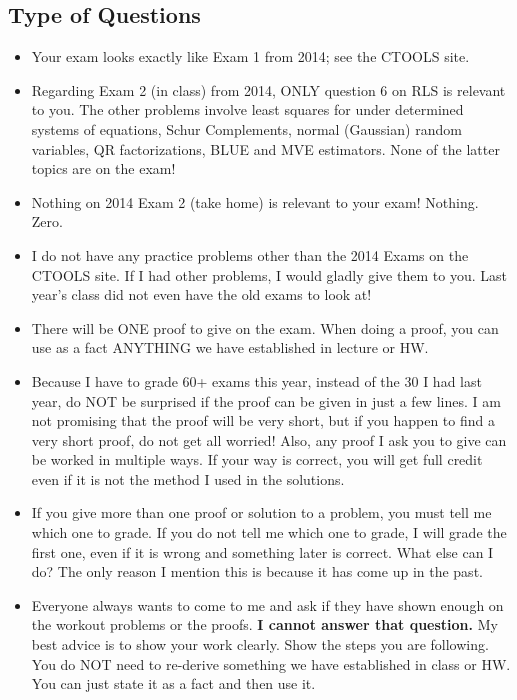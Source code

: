 \documentclass[letterpaper]{article}
\begin{document}
\subsection*{Type of Questions}

\begin{itemize}

\item Your exam looks exactly like Exam 1 from 2014; see the CTOOLS site.

\item Regarding Exam 2 (in class) from 2014, ONLY question 6 on RLS is relevant to you. The other problems involve least squares for under determined systems of equations, Schur Complements, normal (Gaussian) random variables, QR factorizations, BLUE and MVE estimators. None of the latter topics are on the exam!

    \item Nothing on 2014 Exam 2 (take home) is relevant to your exam! Nothing. Zero.

\item I do not have any practice problems other than the 2014 Exams on the CTOOLS site. If I had other problems, I would gladly give them to you. Last year's class did not even have the old exams to look at!

    \item There will be ONE proof to give on the exam. When doing a proof, you can use as a fact ANYTHING we have established in lecture or HW.

    \item Because I have to grade 60+ exams this year, instead of the 30 I had last year, do NOT be surprised if the proof can be given in just a few lines. I am not promising that the proof will be very short, but if you happen to find a very short proof, do not get all worried! Also, any proof I ask you to give can be worked in multiple ways. If your way is correct, you will get full credit even if it is not the method I used in the solutions.

        \item If you give more than one proof or solution to a problem, you must tell me which one to grade. If you do not tell me which one to grade, I will grade the first one, even if it is wrong and something later is correct. What else can I do? The only reason I mention this is because it has come up in the past.

        \item Everyone always wants to come to me and ask if they have shown enough on the workout problems or the proofs. \textbf{I cannot answer that question.} My best advice is to show your work clearly. Show the steps you are following. You do NOT need to re-derive something we have established in class or HW. You can just state it as a fact and then use it.


\end{itemize}
\end{document}
